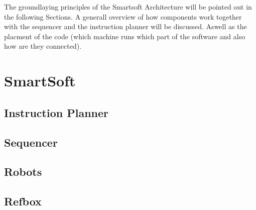 The groundlaying principles of the Smartsoft Architecture will be pointed out in the following
Sections. A generall overview of how components work together with the sequencer and the instruction planner will be discussed. Aswell as the placment of the code (which machine runs which part of the software and also how are they connected).
\section{SmartSoft}
    \subsection{Instruction Planner}
    \subsection{Sequencer}
    \subsection{Robots}
    \subsection{Refbox}
